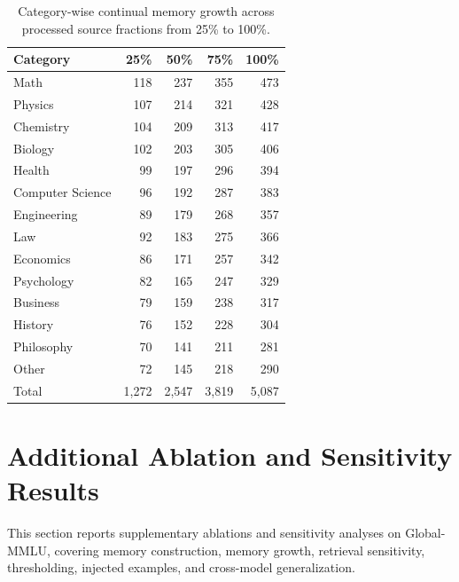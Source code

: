 \documentclass[11pt]{article}
\newcommand{\FloatBarrier}{}
\begin{document}
\begin{table}[!htbp]
\centering
\scriptsize
\setlength{\tabcolsep}{3pt}
\renewcommand{\arraystretch}{0.96}
\begin{tabular}{l r r r r}
\hline
Category & 25\% & 50\% & 75\% & 100\% \\
\hline
Math & 118 & 237 & 355 & 473 \\
Physics & 107 & 214 & 321 & 428 \\
Chemistry & 104 & 209 & 313 & 417 \\
Biology & 102 & 203 & 305 & 406 \\
Health & 99 & 197 & 296 & 394 \\
Computer Science & 96 & 192 & 287 & 383 \\
Engineering & 89 & 179 & 268 & 357 \\
Law & 92 & 183 & 275 & 366 \\
Economics & 86 & 171 & 257 & 342 \\
Psychology & 82 & 165 & 247 & 329 \\
Business & 79 & 159 & 238 & 317 \\
History & 76 & 152 & 228 & 304 \\
Philosophy & 70 & 141 & 211 & 281 \\
Other & 72 & 145 & 218 & 290 \\
Total & 1,272 & 2,547 & 3,819 & 5,087 \\
\hline
\end{tabular}
\caption{Category-wise continual memory growth across processed source fractions from 25\% to 100\%.}
\label{tab:memory_growth_by_category}
\end{table}
\FloatBarrier

\section{Additional Ablation and Sensitivity Results}
\label{sec:app_additional_results}
This section reports supplementary ablations and sensitivity analyses on Global-MMLU, covering memory construction, memory growth, retrieval sensitivity, thresholding, injected examples, and cross-model generalization.
\end{document}

